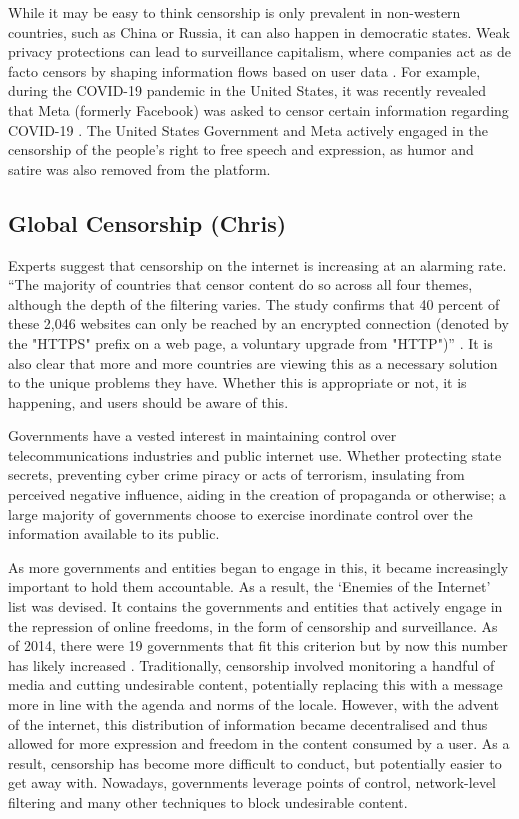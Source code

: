 While it may be easy to think censorship is only prevalent in non-western countries, such as China or Russia, it can also happen in democratic states. Weak privacy protections can lead to surveillance capitalism, where companies act as de facto censors by shaping information flows based on user data \cite{schwartz1999internet}. For example, during the COVID-19 pandemic in the United States, it was recently revealed that Meta (formerly Facebook) was asked to censor certain information regarding COVID-19 \cite{pbsZuckerbergSays}. The United States Government and Meta actively engaged in the censorship of the people's right to free speech and expression, as humor and satire was also removed from the platform.

\subsection{Global Censorship (Chris)}
\label{sec:Chris-Global-Censorship}

Experts suggest that censorship on the internet is increasing at an alarming rate. “The majority of countries that censor content do so across all four themes, although the depth of the filtering varies. The study confirms that 40 percent of these 2,046 websites can only be reached by an 
encrypted connection (denoted by the "HTTPS" prefix on a web page, a voluntary upgrade from "HTTP")” \cite{zittrain2017shifting}. It is also clear that more and more countries are viewing this as a necessary solution to the unique problems they have. Whether this is appropriate or not, it is happening, and users should be aware of this. 

Governments have a vested interest in maintaining control over telecommunications industries and public internet use. Whether protecting state secrets, preventing cyber crime piracy or acts of terrorism, insulating from perceived negative influence, aiding in the creation of propaganda or otherwise; a large majority of governments choose to exercise inordinate control over the 
information available to its public.  

As more governments and entities began to engage in this, it became increasingly important to hold them accountable. As a result, the ‘Enemies of the Internet’ list was devised. It contains the governments and entities that actively engage in the repression of online freedoms, in the form of censorship and surveillance. As of 2014, there were 19 governments that fit this criterion but by now this number has likely increased \cite{GlobalCensorshipRef2}. Traditionally, censorship involved monitoring a handful of media and cutting undesirable content, potentially replacing this with a message more in line with the agenda and norms of the locale. However, with the advent of the internet, this distribution of information became decentralised and thus allowed for more expression and freedom in the content consumed by a user. As a result, censorship has become more difficult to conduct, but potentially easier to get away with. Nowadays, governments leverage points of control, network-level filtering and many other techniques to block undesirable content.





